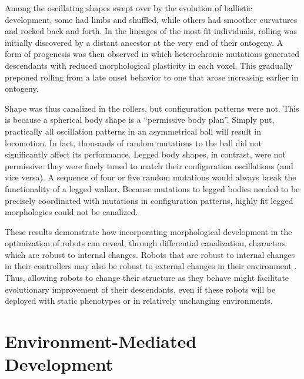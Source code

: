 Among the oscillating shapes swept over by the evolution of ballistic development, some had limbs and shuffled, while others had smoother curvatures and rocked back and forth.
In the lineages of the most fit individuals,
rolling was initially discovered by a distant ancestor at the very end of their ontogeny.
A form of progenesis was then observed in which heterochronic mutations generated descendants with reduced morphological plasticity in each voxel.
This gradually preponed rolling from a late onset behavior to one that arose increasing earlier in ontogeny.

Shape was thus canalized in the rollers, but configuration patterns were not.
This is because a spherical body shape is a ``permissive body plan''.
Simply put, practically all oscillation patterns in an asymmetrical ball will result in locomotion.
In fact, thousands of random mutations to the ball did not significantly affect its performance.
Legged body shapes, in contrast, were not permissive: they were finely tuned to match their configuration oscillations (and vice versa). 
A sequence of four or five random mutations would always break the functionality of a legged walker.
Because mutations to legged bodies needed to be precisely coordinated with mutations in configuration patterns,
highly fit legged morphologies could not be canalized.



These results demonstrate how incorporating morphological development in the optimization of robots can reveal, through differential canalization, characters which are robust to internal changes.
Robots that are robust to internal changes in their controllers may also be robust to external changes in their environment \cite{bongard2011morphological}.
Thus, allowing robots to change their structure as they behave might facilitate evolutionary improvement of their descendants, even if these robots will be deployed with static phenotypes or in relatively unchanging environments.



\section{Environment-Mediated Development}


